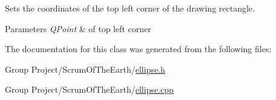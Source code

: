 Sets the coordinates of the top left corner of the drawing rectangle. 


\begin{DoxyParams}{Parameters}
{\em Q\+Point} & of top left corner \\
\hline
\end{DoxyParams}


The documentation for this class was generated from the following files\+:\begin{DoxyCompactItemize}
\item 
Group Project/\+Scrum\+Of\+The\+Earth/\hyperlink{ellipse_8h}{ellipse.\+h}\item 
Group Project/\+Scrum\+Of\+The\+Earth/\hyperlink{ellipse_8cpp}{ellipse.\+cpp}\end{DoxyCompactItemize}
